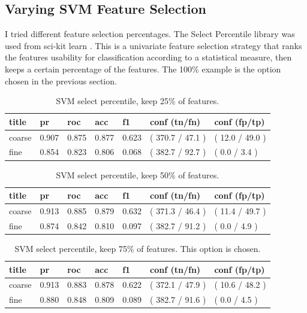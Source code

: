 \documentclass[ms]{nuthesis}
\begin{document}
\subsection{Varying SVM Feature Selection}
\par I tried different feature selection percentages. The Select Percentile library was used from
sci-kit learn \cite{scikit-learn}. This is a univariate feature selection strategy that ranks the
features usability for classification according to a statistical measure, then keeps a certain
percentage of the features. The 100\% example is the option chosen in the previous section.

\FloatBarrier
\begin{table}[H]
\centering
\caption{SVM select percentile, keep 25\% of features.}
\label{tab:SVMSel25}
\begin{tabular}{|l||l||l||l||l||l||l|}\toprule
title & pr & roc & acc & f1 & conf (tn/fn) & conf (fp/tp) \\ \midrule
coarse & 0.907 & 0.875 & 0.877 & 0.623 & ( 370.7 / 47.1 ) & ( 12.0 / 49.0 ) \\
fine & 0.854 & 0.823 & 0.806 & 0.068 & ( 382.7 / 92.7 ) & ( 0.0 / 3.4 ) \\ \bottomrule
\end{tabular}
\end{table}
\FloatBarrier


\FloatBarrier
\begin{table}[H]
\centering
\caption{SVM select percentile, keep 50\% of features.}
\label{tab:SVMSel50}
\begin{tabular}{|l||l||l||l||l||l||l|}\toprule
title & pr & roc & acc & f1 & conf (tn/fn) & conf (fp/tp) \\ \midrule
coarse & 0.913 & 0.885 & 0.879 & 0.632 & ( 371.3 / 46.4 ) & ( 11.4 / 49.7 ) \\
fine & 0.874 & 0.842 & 0.810 & 0.097 & ( 382.7 / 91.2 ) & ( 0.0 / 4.9 ) \\ \bottomrule
\end{tabular}
\end{table}
\FloatBarrier



\FloatBarrier
\begin{table}[H]
\centering
\caption{SVM select percentile, keep 75\% of features. This option is chosen.}
\label{tab:SVMSel75}
\begin{tabular}{|l||l||l||l||l||l||l|}\toprule
title & pr & roc & acc & f1 & conf (tn/fn) & conf (fp/tp) \\ \midrule
coarse & 0.913 & 0.883 & 0.878 & 0.622 & ( 372.1 / 47.9 ) & ( 10.6 / 48.2 ) \\
fine & 0.880 & 0.848 & 0.809 & 0.089 & ( 382.7 / 91.6 ) & ( 0.0 / 4.5 ) \\ \bottomrule
\end{tabular}
\end{table}
\FloatBarrier
\end{document}
